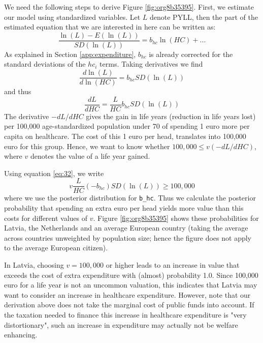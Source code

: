 \documentclass[12pt,english,a4paper]{article}
\begin{document}
We need the following steps to derive Figure \ref{fig:org8b35395}. First, we estimate our model using standardized variables. Let \(L\) denote PYLL, then the part of the estimated equation that we are interested in here can be written as:
\begin{equation}
\label{eq:27}
\frac{\ln(L)-E(\ln(L))}{SD(\ln(L))} = b_{hc} \ln(HC) + ...
\end{equation}
As explained in Section \ref{app:expenditure}, \(b_{hc}\) is already corrected for the standard deviations of the \(hc_i\) terms. Taking derivatives we find
\begin{equation}
\label{eq:31}
\frac{d \ln(L)}{d \ln(HC)} = b_{hc} SD(\ln(L))
\end{equation}
and thus
\begin{equation}
\label{eq:32}
\frac{dL}{dHC} = \frac{L}{HC} b_{hc} SD(\ln(L))
\end{equation}
The derivative \(-dL/dHC\) gives the gain in life years (reduction in life years lost) per 100,000 age-standardized population under 70 of spending 1 euro more per capita on healthcare. The cost of this 1 euro per head, translates into 100,000 euro for this group. Hence, we want to know whether \(100,000 \leq v (-dL/dHC)\), where \(v\) denotes the value of a life year gained. 

Using equation \eqref{eq:32}, we write
\begin{equation}
\label{eq:22}
v \frac{L}{HC} (-b_{hc}) SD(\ln(L)) \geq 100,000
\end{equation}
where we use the posterior distribution for \texttt{b\_hc}. Thus we calculate the posterior probability that spending an extra euro per head yields more value than this costs for different values of \(v\). Figure \ref{fig:org8b35395} shows these probabilities for Latvia, the Netherlands and an average European country (taking the average across countries unweighted by population size; hence the figure does not apply to the average European citizen).

In Latvia, choosing \(v = 100,000\) or higher leads to an increase in value that exceeds the cost of extra expenditure with (almost) probability 1.0. Since 100,000 euro for a life year is not an uncommon valuation, this indicates that Latvia may want to consider an increase in healthcare expenditure. However, note that our derivation above does not take the marginal cost of public funds into account. If the taxation needed to finance this increase in healthcare expenditure is "very distortionary", such an increase in expenditure may actually not be welfare enhancing.
\end{document}
